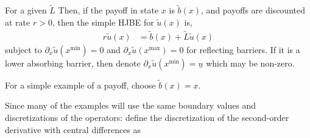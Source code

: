 \documentclass[11pt]{article}
\newcommand{\D}[1][]{\ensuremath{\partial_{#1}}}
\begin{document}
For a given $\tilde{L}$ Then, if the payoff in state $x$ is $\tilde{b}(x)$, and payoffs are discounted at rate $r > 0$, then the simple HJBE for $\tilde{u}(x)$ is,
\begin{align}
r \tilde{u}(x) &= \tilde{b}(x) + \tilde{L} \tilde{u}(x)\label{eq:general-stationary-HJBE}
\end{align}
subject to $\D[x]\tilde{u}(x^{\min}) = 0$ and $\D[x]\tilde{u}(x^{\max}) = 0$ for reflecting barriers.  If it is a lower absorbing barrier, then denote $\D[x]\tilde{u}(x^{\min}) = \underline{u}$ which may be non-zero.

For a simple example of a payoff, choose $\tilde{b}(x) = x$.

Since many of the examples will use the same boundary values and discretizations of the operators: define the discretization of the second-order derivative with central differences as
\end{document}

